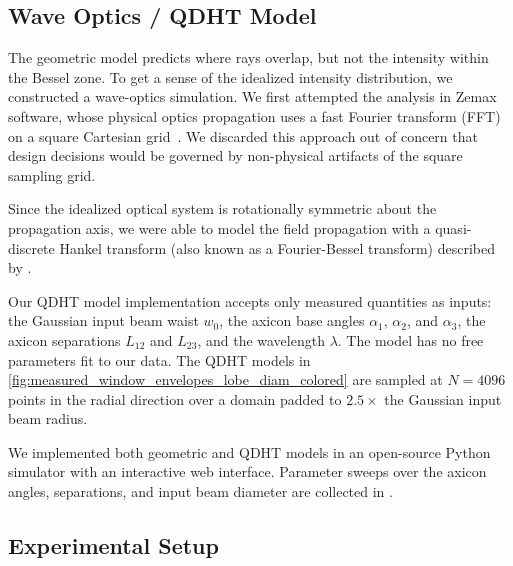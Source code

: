 \documentclass[
  aps,
  twocolumn,
  reprint,              %
  superscriptaddress,
  amsmath,
  amssymb,
  floatfix,
  longbibliography,      %
  nofootinbib %
]{revtex4-2}
\begin{document}
\subsection{Wave Optics / QDHT Model}\label{sec:qdht_model}
The geometric model predicts where rays overlap, but not the intensity within the Bessel zone. To get a sense of the idealized intensity distribution, we constructed a wave-optics simulation. We first attempted the analysis in Zemax software, whose physical optics propagation uses a fast Fourier transform (FFT) on a square Cartesian grid~\cite{ZemaxOpticStudio}. We discarded this approach out of concern that design decisions would be governed by non-physical artifacts of the square sampling grid.

Since the idealized optical system is rotationally symmetric about the propagation axis, we were able to model the field propagation with a quasi-discrete Hankel transform (also known as a Fourier-Bessel transform) described by \citet{yuQuasidiscreteHankelTransform1998a}.

Our QDHT model implementation accepts only measured quantities as inputs: the Gaussian input beam waist $w_0$, the axicon base angles $\alpha_1$, $\alpha_2$, and $\alpha_3$, the axicon separations $L_{12}$ and $L_{23}$, and the wavelength $\lambda$. The model has no free parameters fit to our data. The QDHT models in \autoref{fig:measured_window_envelopes_lobe_diam_colored} are sampled at $N=4096$ points in the radial direction over a domain padded to $2.5\times$ the Gaussian input beam radius.


We implemented both geometric and QDHT models in an open-source Python simulator with an interactive web interface\footnotemark[1]. Parameter sweeps over the axicon angles, separations, and input beam diameter are collected in .

\subsection{Experimental Setup}\label{sec:experimental_setup}
\end{document}
